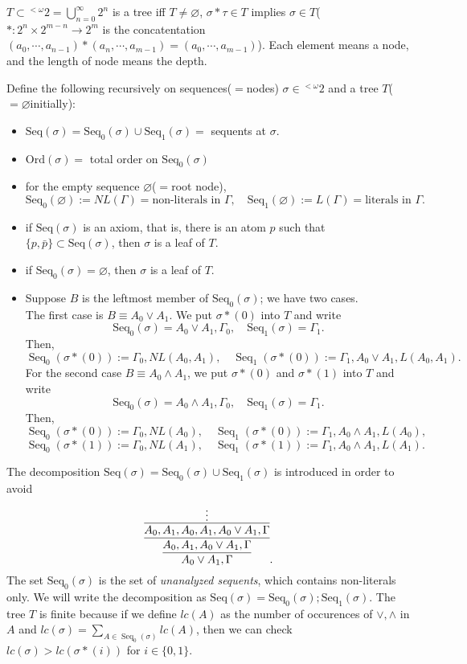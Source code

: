 \documentclass{../../../small}
\DeclareMathOperator{\Seq}{Seq}
\begin{document}
\begin{pf}
$T\subset{}^{<\omega}2=\bigcup_{n=0}^\infty 2^n$ is a tree iff $T\ne\varnothing$, $\sigma*\tau\in T$ implies $\sigma\in T$($*:2^n\times 2^{m-n}\to 2^m$ is the concatentation $(a_0,\cdots,a_{n-1})*(a_n,\cdots,a_{m-1})=(a_0,\cdots,a_{m-1})$).
Each element means a node, and the length of node means the depth.

Define the following recursively on sequences($=$nodes)  $\sigma\in{}^{<\omega}2$ and a tree $T$($=\varnothing$initially):
\begin{itemize}
\item $\mathrm{Seq}(\sigma)=\mathrm{Seq}_0(\sigma)\cup\mathrm{Seq}_1(\sigma)=$ sequents at $\sigma$.
\item $\mathrm{Ord}(\sigma)=$ total order on $\mathrm{Seq}_0(\sigma)$
\item for the empty sequence $\varnothing$($=$root node),
\[\mathrm{Seq}_0(\varnothing):=NL(\Gamma)=\text{non-literals in $\Gamma$},\quad\mathrm{Seq}_1(\varnothing):=L(\Gamma)=\text{literals in $\Gamma$}.\]
\item if $\mathrm{Seq}(\sigma)$ is an axiom, that is, there is an atom $p$ such that $\{p,\bar p\}\subset\mathrm{Seq}(\sigma)$, then $\sigma$ is a leaf of $T$.
\item if $\mathrm{Seq}_0(\sigma)=\varnothing$, then $\sigma$ is a leaf of $T$.
\item Suppose $B$ is the leftmost member of $\mathrm{Seq}_0(\sigma)$; we have two cases.\\
The first case is $B\equiv A_0\vee A_1$.
We put $\sigma*(0)$ into $T$ and write
\[\mathrm{Seq}_0(\sigma)=A_0\vee A_1,\Gamma_0,\quad\mathrm{Seq}_1(\sigma)=\Gamma_1.\]
Then,
\[\Seq_0(\sigma*(0)):=\Gamma_0,NL(A_0,A_1),\quad\Seq_1(\sigma*(0)):=\Gamma_1,A_0\vee A_1,L(A_0,A_1).\]
For the second case $B\equiv A_0\wedge A_1$, we put $\sigma*(0)$ and $\sigma*(1)$ into $T$ and write
\[\mathrm{Seq}_0(\sigma)=A_0\wedge A_1,\Gamma_0,\quad\mathrm{Seq}_1(\sigma)=\Gamma_1.\]
Then,
\[\Seq_0(\sigma*(0)):=\Gamma_0,NL(A_0),\quad\Seq_1(\sigma*(0)):=\Gamma_1,A_0\wedge A_1,L(A_0),\]
\[\Seq_0(\sigma*(1)):=\Gamma_0,NL(A_1),\quad\Seq_1(\sigma*(1)):=\Gamma_1,A_0\wedge A_1,L(A_1).\]
\end{itemize}
The decomposition $\mathrm{Seq}(\sigma)=\mathrm{Seq}_0(\sigma)\cup\mathrm{Seq}_1(\sigma)$ is introduced in order to avoid
\[\infer{A_0\vee A_1,\Gamma}{\infer{A_0,A_1,A_0\vee A_1,\Gamma}{\infer{A_0,A_1,A_0,A_1,A_0\vee A_1,\Gamma}{\vdots}}}.\]
The set $\mathrm{Seq}_0(\sigma)$ is the set of \emph{unanalyzed sequents}, which contains non-literals only.
We will write the decomposition as $\mathrm{Seq}(\sigma)=\mathrm{Seq}_0(\sigma);\mathrm{Seq}_1(\sigma)$.
The tree $T$ is finite because if we define $lc(A)$ as the number of occurences of $\vee,\wedge$ in $A$ and $lc(\sigma)=\sum_{A\in\Seq_0(\sigma)} lc(A)$, then we can check $lc(\sigma)>lc(\sigma*(i))$ for $i\in\{0,1\}$.


\end{pf}
\end{document}
